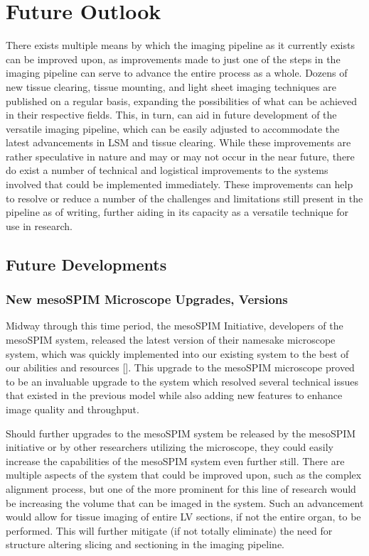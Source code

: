 \newpage
\section{Future Outlook}
There exists multiple means by which the imaging pipeline as it currently exists can be improved upon, as improvements made to just one of the steps in the imaging pipeline can serve to advance the entire process as a whole. Dozens of new tissue clearing, tissue mounting, and light sheet imaging techniques are published on a regular basis, expanding the possibilities of what can be achieved in their respective fields. This, in turn, can aid in future development of the versatile imaging pipeline, which can be easily adjusted to accommodate the latest advancements in LSM and tissue clearing. While these improvements are rather speculative in nature and may or may not occur in the near future, there do exist a number of technical and logistical improvements to the systems involved that could be implemented immediately. These improvements can help to resolve or reduce a number of the challenges and limitations still present in the pipeline as of writing, further aiding in its capacity as a versatile technique for use in research.

\subsection{Future Developments}
\subsubsection{New mesoSPIM Microscope Upgrades, Versions}
Midway through this time period, the mesoSPIM Initiative, developers of the mesoSPIM system, released the latest version of their namesake microscope system, which was quickly implemented into our existing system to the best of our abilities and resources []. This upgrade to the mesoSPIM microscope proved to be an invaluable upgrade to the system which resolved several technical issues that existed in the previous model while also adding new features to enhance image quality and throughput. 

Should further upgrades to the mesoSPIM system be released by the mesoSPIM initiative or by other researchers utilizing the microscope, they could easily increase the capabilities of the mesoSPIM system even further still. There are multiple aspects of the system that could be improved upon, such as the complex alignment process, but one of the more prominent for this line of research would be increasing the volume that can be imaged in the system. Such an advancement would allow for tissue imaging of entire LV sections, if not the entire organ, to be performed. This will further mitigate (if not totally eliminate) the need for structure altering slicing and sectioning in the imaging pipeline.

